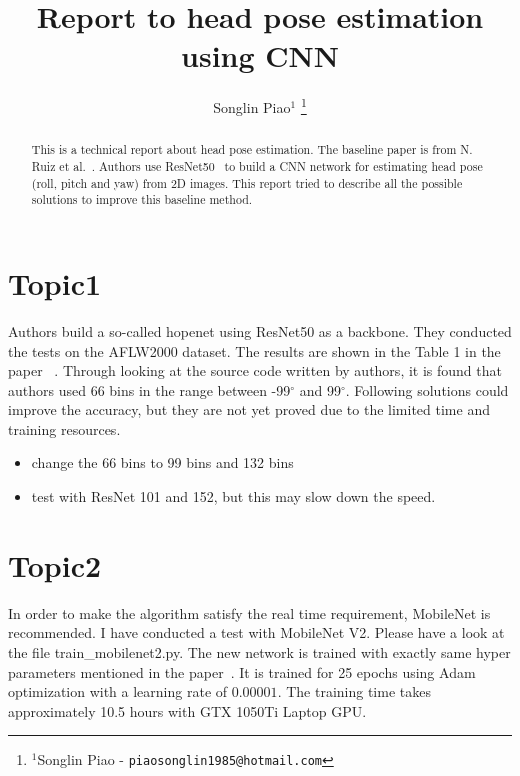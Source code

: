 \documentclass[letterpaper, 10 pt, conference]{ieeeconf}  %
\title{\LARGE \bf
Report to head pose estimation using CNN
}
\author{Songlin Piao$^{1}$
\thanks{$^{1}$Songlin Piao - 
        {\tt\small piaosonglin1985@hotmail.com}}%
}
\begin{document}
\maketitle
\thispagestyle{empty}
\pagestyle{empty}


\begin{abstract}

This is a technical report about head pose estimation. The baseline paper is from N. Ruiz et al.~\cite{Ruiz2017}. Authors use ResNet50~\cite{He2015} to build a CNN network for estimating head pose (roll, pitch and yaw) from 2D images. This report tried to describe all the possible solutions to improve this baseline method.

\end{abstract}


\section{Topic1}

Authors build a so-called hopenet using ResNet50 as a backbone. They conducted the tests on the AFLW2000 dataset. The results are shown in the Table 1 in the paper ~\cite{Ruiz2017}. Through looking at the source code written by authors, it is found that authors used 66 bins in the range between -99$^\circ$ and 99$^\circ$.
Following solutions could improve the accuracy, but they are not yet proved due to the limited time and training resources.

\begin{itemize}
	\item change the 66 bins to 99 bins and 132 bins
	\item test with ResNet 101 and 152, but this may slow down the speed.
\end{itemize}


\section{Topic2}

In order to make the algorithm satisfy the real time requirement, MobileNet is recommended. I have conducted a test with MobileNet V2. Please have a look at the file train\_mobilenet2.py. The new network is trained with exactly same hyper parameters mentioned in the paper~\cite{Ruiz2017}. It is trained for 25 epochs using Adam optimization with a learning rate of $0.00001$. The training time takes approximately 10.5 hours with GTX 1050Ti Laptop GPU.
\end{document}
